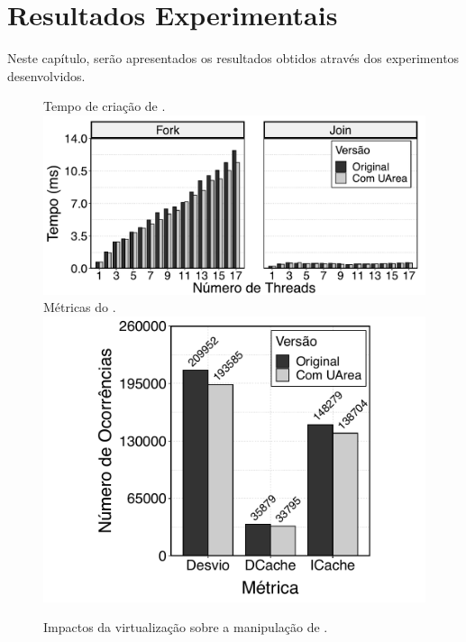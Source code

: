 \chapter{Resultados Experimentais}
\label{chap.results}

Neste capítulo, serão apresentados os resultados obtidos através dos experimentos desenvolvidos.
\begin{figure}[tb]
	\centering
    \caption{Impactos da virtualização sobre a manipulação de \threads.
    \label{fig.threads}}%
                   {Tempo de criação de \threads.}
                   {\includegraphics[width=\textwidth]{content/images/fork-join-kernel-time-bars.pdf}}
	\quad
                   {Métricas do .}
                   {\includegraphics[width=\textwidth]{content/images/fork-join-kernel-counters.pdf}}
\end{figure}

